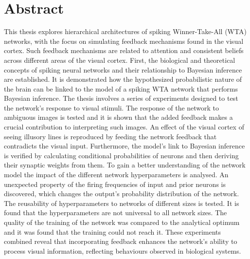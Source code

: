 
\section*{Abstract}
\label{cha:abstract}

This thesis explores hierarchical architectures of spiking Winner-Take-All (WTA) networks, with the focus on simulating feedback mechanisms found in the visual cortex. Such feedback mechanisms are related to attention and consistent beliefs across different areas of the visual cortex. 
First, the biological and theoretical concepts of spiking neural networks and their relationship to Bayesian inference are established. It is demonstrated how the hypothesized probabilistic nature of the brain can be linked to the model of a spiking WTA network that performs Bayesian inference.
The thesis involves a series of experiments designed to test the network's response to visual stimuli. The response of the network to ambiguous images is tested and it is shown that the added feedback makes a crucial contribution to interpreting such images. An effect of the visual cortex of seeing illusory lines is reproduced by feeding the network feedback that contradicts the visual input. Furthermore, the model's link to Bayesian inference is verified by calculating conditional probabilities of neurons and then deriving their synaptic weights from them. To gain a better understanding of the network model the impact of the different network hyperparameters is analysed. An unexpected property of the firing frequencies of input and prior neurons is discovered, which changes the output's probability distribution of the network. The reusability of hyperparameters to networks of different sizes is tested. It is found that the hyperparameters are not universal to all network sizes. The quality of the training of the network was compared to the analytical optimum and it was found that the training could not reach it. These experiments combined reveal that incorporating feedback enhances the network's ability to process visual information, reflecting behaviours observed in biological systems.

